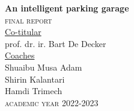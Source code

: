 \begin{titlepage}
\begin{center}
\begin{minipage}[t]{\textwidth}
\begin{center}
                \Huge{\rm\textbf{An intelligent parking garage}} \\
                \vspace{1cm}
                \large{\rm\textsc{{final report}}} \\
                \vspace{4cm}
                {\rm \large\underline{Co-titular}} \\
                {\rm \normalsize{prof. dr. ir. Bart De Decker}} \\
                \vspace{0.5cm}
                {\rm \large\underline{Coaches}} \\
                {\rm \normalsize{Shuaibu Musa Adam}} \\
                {\rm \normalsize{Shirin Kalantari}} \\
                {\rm \normalsize{Hamdi Trimech}} \\
                \vspace{1.5cm}
                \LARGE{\rm\textsc{academic year 2022-2023}}
                \vfill
            \end{center}
        \end{minipage}
    \end{center}
    \vfill
\end{titlepage}
